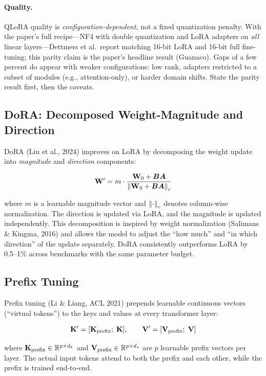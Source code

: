 \paragraph{Quality.}
QLoRA quality is \emph{configuration-dependent}, not a fixed quantization
penalty.  With the paper's full recipe---NF4 with double quantization and LoRA
adapters on \emph{all} linear layers---Dettmers et al.\ report matching 16-bit
LoRA and 16-bit full fine-tuning; this parity claim is the paper's headline
result (Guanaco).  Gaps of a few percent do appear with weaker configurations:
low rank, adapters restricted to a subset of modules (e.g., attention-only),
or harder domain shifts.  State the parity result first, then the caveats.

\subsection{DoRA: Decomposed Weight-Magnitude and Direction}
\label{sec:dora}

DoRA (Liu et al., 2024) improves on LoRA by decomposing the weight update into
\emph{magnitude} and \emph{direction} components:

\[
    \mathbf{W}' = m \cdot \frac{\mathbf{W}_0 + \bm{B}\bm{A}}{\left\lVert\mathbf{W}_0 + \bm{B}\bm{A}\right\rVert_c}
\]

where $m$ is a learnable magnitude vector and $\left\lVert\cdot\right\rVert_c$ denotes
column-wise normalization.  The direction is updated via LoRA, and the magnitude
is updated independently.  This decomposition is inspired by weight normalization
(Salimans \& Kingma, 2016) and allows the model to adjust the ``how much''
and ``in which direction'' of the update separately.  DoRA consistently
outperforms LoRA by 0.5--1\% across benchmarks with the same parameter budget.

\subsection{Prefix Tuning}
\label{sec:prefix-tuning}

Prefix tuning (Li \& Liang, ACL 2021) prepends learnable continuous vectors
(``virtual tokens'') to the keys and values at every transformer layer:

\[
    \mathbf{K}' = [\mathbf{K}_{\text{prefix}};\; \mathbf{K}], \qquad
    \mathbf{V}' = [\mathbf{V}_{\text{prefix}};\; \mathbf{V}]
\]

where $\mathbf{K}_{\text{prefix}} \in \mathbb{R}^{p \times d_k}$ and
$\mathbf{V}_{\text{prefix}} \in \mathbb{R}^{p \times d_v}$ are $p$ learnable prefix vectors
per layer.  The actual input tokens attend to both the prefix and each other,
while the prefix is trained end-to-end.

